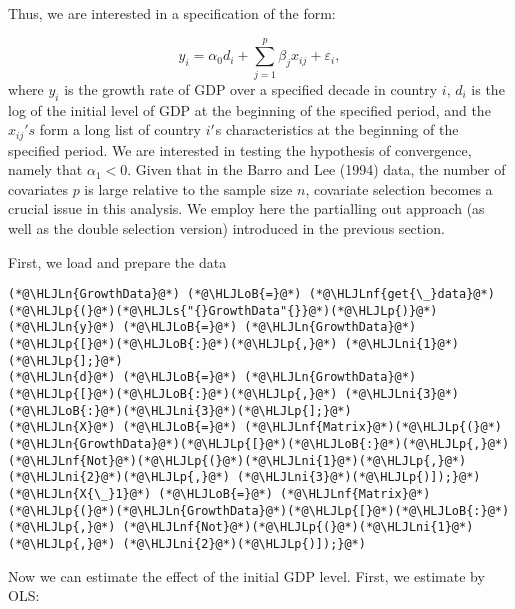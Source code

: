 \documentclass[12pt,a4paper]{article}
\newcommand{\HLJLn}[1]{#1}
\newcommand{\HLJLnf}[1]{\textcolor[RGB]{66,102,213}{#1}}
\newcommand{\HLJLs}[1]{\textcolor[RGB]{201,61,57}{#1}}
\newcommand{\HLJLni}[1]{\textcolor[RGB]{59,151,46}{#1}}
\newcommand{\HLJLoB}[1]{\textcolor[RGB]{102,102,102}{\textbf{#1}}}
\newcommand{\HLJLp}[1]{#1}
\begin{document}
Thus, we are interested in a specification of the form:

\[
y_i = \alpha_0d_i + \sum_{j=1}^p \beta_j x_{ij} + \varepsilon_i, 
\]
where $y_i$ is the growth rate of GDP over a specified decade in country $i$, $d_i$ is the log of the initial level of GDP at the beginning of the specified period, and the $x_{ij}'s$ form a long list of country $i$\ensuremath{\rq}s characteristics at the beginning of the specified period. We are interested in testing the hypothesis of convergence, namely that $\alpha_1 < 0$. Given that in the Barro and Lee (1994) data, the number of covariates $p$ is large relative to the sample size $n$, covariate selection becomes a crucial issue in this analysis. We employ here the partialling out approach (as well as the double selection version) introduced in the previous section.

First, we load and prepare the data


\begin{lstlisting}
(*@\HLJLn{GrowthData}@*) (*@\HLJLoB{=}@*) (*@\HLJLnf{get{\_}data}@*)(*@\HLJLp{(}@*)(*@\HLJLs{"{}GrowthData"{}}@*)(*@\HLJLp{)}@*)
(*@\HLJLn{y}@*) (*@\HLJLoB{=}@*) (*@\HLJLn{GrowthData}@*)(*@\HLJLp{[}@*)(*@\HLJLoB{:}@*)(*@\HLJLp{,}@*) (*@\HLJLni{1}@*)(*@\HLJLp{];}@*)
(*@\HLJLn{d}@*) (*@\HLJLoB{=}@*) (*@\HLJLn{GrowthData}@*)(*@\HLJLp{[}@*)(*@\HLJLoB{:}@*)(*@\HLJLp{,}@*) (*@\HLJLni{3}@*)(*@\HLJLoB{:}@*)(*@\HLJLni{3}@*)(*@\HLJLp{];}@*)
(*@\HLJLn{X}@*) (*@\HLJLoB{=}@*) (*@\HLJLnf{Matrix}@*)(*@\HLJLp{(}@*)(*@\HLJLn{GrowthData}@*)(*@\HLJLp{[}@*)(*@\HLJLoB{:}@*)(*@\HLJLp{,}@*) (*@\HLJLnf{Not}@*)(*@\HLJLp{(}@*)(*@\HLJLni{1}@*)(*@\HLJLp{,}@*) (*@\HLJLni{2}@*)(*@\HLJLp{,}@*) (*@\HLJLni{3}@*)(*@\HLJLp{)]);}@*)
(*@\HLJLn{X{\_}1}@*) (*@\HLJLoB{=}@*) (*@\HLJLnf{Matrix}@*)(*@\HLJLp{(}@*)(*@\HLJLn{GrowthData}@*)(*@\HLJLp{[}@*)(*@\HLJLoB{:}@*)(*@\HLJLp{,}@*) (*@\HLJLnf{Not}@*)(*@\HLJLp{(}@*)(*@\HLJLni{1}@*)(*@\HLJLp{,}@*) (*@\HLJLni{2}@*)(*@\HLJLp{)]);}@*)
\end{lstlisting}


Now we can estimate the effect of the initial GDP level. First, we estimate by OLS:
\end{document}
